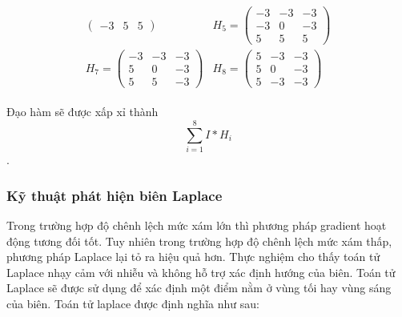 \documentclass[12pt, oneside, a4paper]{book}
\begin{document}
\begin{itemize}
\begin{align*}
\begin{matrix}
\begin{pmatrix}
        -3 & 5 & 5
    \end{pmatrix} & H_5=\begin{pmatrix}
        -3 & -3 & -3 \\
        -3 & 0 & -3  \\
        5 & 5 & 5
    \end{pmatrix}\\
        H_7=\begin{pmatrix}
        -3 & -3 & -3 \\
        5 & 0 & -3  \\
        5 & 5 & -3
    \end{pmatrix} & H_8=\begin{pmatrix}
        5 & -3 & -3 \\
        5 & 0 & -3  \\
        5 & -3 & -3
    \end{pmatrix}
    \end{matrix}
\end{align*}
\end{itemize}
Đạo hàm sẽ được xấp xỉ thành $$\sum_{i=1}^{8} I\ast H_i$$.
\subsubsection{Kỹ thuật phát hiện biên Laplace }
Trong trường hợp độ chênh lệch mức xám lớn thì phương pháp gradient hoạt động tương đối tốt. Tuy nhiên trong trường hợp độ chênh lệch mức xám thấp, phương pháp Laplace lại tỏ ra hiệu quả hơn. Thực nghiệm cho thấy toán tử Laplace nhạy cảm với nhiễu và không hỗ trợ xác định hướng của biên. Toán tử Laplace sẽ được sử dụng để xác định một điểm nằm ở vùng tối hay vùng sáng của biên. Toán tử laplace được định nghĩa như sau:
\end{document}
